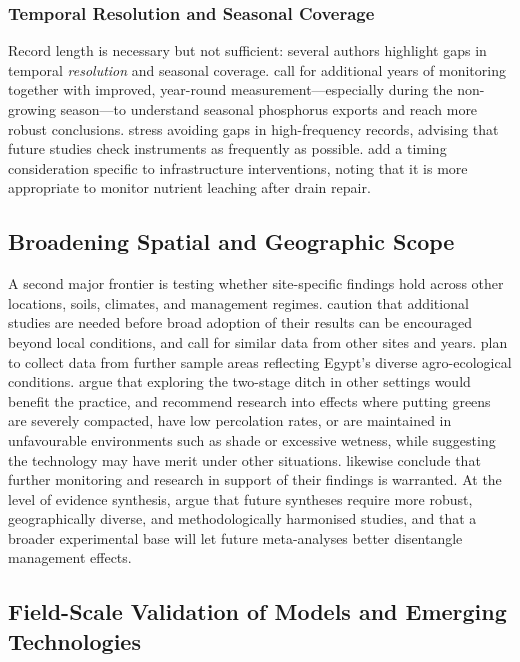\subsubsection{Temporal Resolution and Seasonal Coverage}

Record length is necessary but not sufficient: several authors highlight gaps in temporal \emph{resolution} and seasonal coverage. \textcite{Klaiber2020} call for additional years of monitoring together with improved, year-round measurement---especially during the non-growing season---to understand seasonal phosphorus exports and reach more robust conclusions. \textcite{Hodaj2017} stress avoiding gaps in high-frequency records, advising that future studies check instruments as frequently as possible. \textcite{Wesström2015} add a timing consideration specific to infrastructure interventions, noting that it is more appropriate to monitor nutrient leaching after drain repair.

\subsection{Broadening Spatial and Geographic Scope}

A second major frontier is testing whether site-specific findings hold across other locations, soils, climates, and management regimes. \textcite{Menegaz2025} caution that additional studies are needed before broad adoption of their results can be encouraged beyond local conditions, and \textcite{Zimmerman2017b} call for similar data from other sites and years. \textcite{Ali2001} plan to collect data from further sample areas reflecting Egypt's diverse agro-ecological conditions. \textcite{Hodaj2017} argue that exploring the two-stage ditch in other settings would benefit the practice, and \textcite{Bigelow2001} recommend research into effects where putting greens are severely compacted, have low percolation rates, or are maintained in unfavourable environments such as shade or excessive wetness, while suggesting the technology may have merit under other situations. \textcite{Terrado2015} likewise conclude that further monitoring and research in support of their findings is warranted. At the level of evidence synthesis, \textcite{Wu2025} argue that future syntheses require more robust, geographically diverse, and methodologically harmonised studies, and that a broader experimental base will let future meta-analyses better disentangle management effects.

\subsection{Field-Scale Validation of Models and Emerging Technologies}

